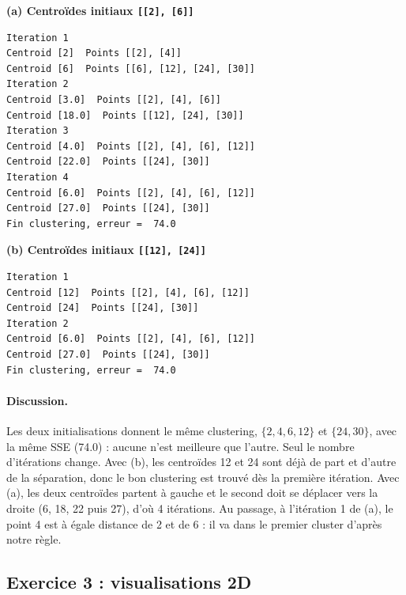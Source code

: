 \documentclass[11pt,a4paper]{article}
\renewcommand{\_}{\underscoreorig\allowbreak}
\begin{document}
\medskip\noindent\textbf{(a) Centroïdes initiaux \texttt{[[2], [6]]}}
\begin{lstlisting}
Iteration 1
Centroid [2]  Points [[2], [4]]
Centroid [6]  Points [[6], [12], [24], [30]]
Iteration 2
Centroid [3.0]  Points [[2], [4], [6]]
Centroid [18.0]  Points [[12], [24], [30]]
Iteration 3
Centroid [4.0]  Points [[2], [4], [6], [12]]
Centroid [22.0]  Points [[24], [30]]
Iteration 4
Centroid [6.0]  Points [[2], [4], [6], [12]]
Centroid [27.0]  Points [[24], [30]]
Fin clustering, erreur =  74.0
\end{lstlisting}

\medskip\noindent\textbf{(b) Centroïdes initiaux \texttt{[[12], [24]]}}
\begin{lstlisting}
Iteration 1
Centroid [12]  Points [[2], [4], [6], [12]]
Centroid [24]  Points [[24], [30]]
Iteration 2
Centroid [6.0]  Points [[2], [4], [6], [12]]
Centroid [27.0]  Points [[24], [30]]
Fin clustering, erreur =  74.0
\end{lstlisting}

\paragraph{Discussion.} Les deux initialisations donnent le même clustering, $\{2, 4, 6, 12\}$ et $\{24, 30\}$, avec la même SSE (74.0) : aucune n'est meilleure que l'autre. Seul le nombre d'itérations change. Avec (b), les centroïdes 12 et 24 sont déjà de part et d'autre de la séparation, donc le bon clustering est trouvé dès la première itération. Avec (a), les deux centroïdes partent à gauche et le second doit se déplacer vers la droite (6, 18, 22 puis 27), d'où 4 itérations. Au passage, à l'itération 1 de (a), le point 4 est à égale distance de 2 et de 6 : il va dans le premier cluster d'après notre règle.

\subsection{Exercice 3 : visualisations 2D}
\end{document}
